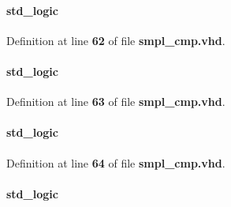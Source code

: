 \paragraph[{A\+I\+\_\+err}]{ {\bfseries \textcolor{comment}{std\+\_\+logic}\textcolor{vhdlchar}{ }} \hspace{0.3cm}{\ttfamily [Signal]}}\label{classsmpl__cmp_1_1arch_aea658102c1797256b4751bebb460ab71}


Definition at line {\bf 62} of file {\bf smpl\+\_\+cmp.\+vhd}.

\paragraph[{A\+Q\+\_\+err}]{ {\bfseries \textcolor{comment}{std\+\_\+logic}\textcolor{vhdlchar}{ }} \hspace{0.3cm}{\ttfamily [Signal]}}\label{classsmpl__cmp_1_1arch_a8ea6f9076e094024b354defb6089ec08}


Definition at line {\bf 63} of file {\bf smpl\+\_\+cmp.\+vhd}.

\paragraph[{B\+I\+\_\+err}]{ {\bfseries \textcolor{comment}{std\+\_\+logic}\textcolor{vhdlchar}{ }} \hspace{0.3cm}{\ttfamily [Signal]}}\label{classsmpl__cmp_1_1arch_adf20f0c9c0792d358a40e3de7c2fb6a1}


Definition at line {\bf 64} of file {\bf smpl\+\_\+cmp.\+vhd}.

\paragraph[{B\+Q\+\_\+err}]{ {\bfseries \textcolor{comment}{std\+\_\+logic}\textcolor{vhdlchar}{ }} \hspace{0.3cm}{\ttfamily [Signal]}}\label{classsmpl__cmp_1_1arch_a91c545c1f1535c8f634ca98eee195f2b}


